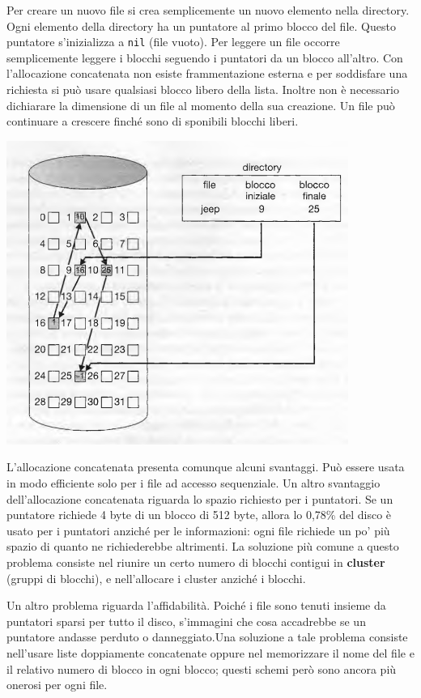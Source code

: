 \documentclass[11pt,a4paper]{article}
\begin{document}
{Per creare un nuovo file si crea semplicemente un nuovo elemento nella directory. Ogni elemento della directory ha un puntatore al primo blocco del file. Questo puntatore s'inizializza a \texttt{nil} (file vuoto). Per leggere un file occorre semplicemente leggere i blocchi seguendo i puntatori da un blocco all'altro. Con l'al­locazione concatenata non esiste frammentazione esterna e per soddisfare una richiesta si può usare qualsiasi blocco libero della lista. Inoltre non è necessario dichiarare la dimensione di un file al momento della sua creazione. Un file può continuare a crescere finché sono di­
sponibili blocchi liberi.
\begin{center}
  \includegraphics[scale=0.6]{img/0056.png}
\end{center}
L'allocazione concatenata presenta comunque alcuni svantaggi. Può essere usata in modo efficiente solo per i file ad accesso sequenziale. Un altro svantaggio dell'allocazione concatenata riguarda lo spazio richiesto per i pun­tatori. Se un puntatore richiede 4 byte di un blocco di 512 byte, allora lo 0,78\% del disco è usato per i puntatori anziché per le informazioni: ogni file richiede un po' più spazio di quanto ne richiederebbe altrimenti.
La soluzione più comune a questo problema consiste nel riunire un certo numero di
blocchi contigui in \textbf{cluster} (gruppi di blocchi), e nell'allocare i cluster anziché i blocchi.

Un altro problema riguarda l'affidabilità. Poiché i file sono tenuti insieme da puntato­ri sparsi per tutto il disco, s'immagini che cosa accadrebbe se un puntatore andasse perduto
o danneggiato.Una soluzione a tale problema consiste nell'usare liste doppiamente concatenate oppure nel memorizzare il nome del file e il relativo numero di blocco in ogni blocco; questi
schemi però sono ancora più onerosi per ogni file.

}
\end{document}
